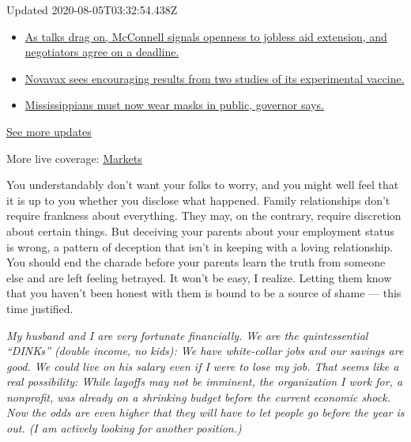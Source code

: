 Updated 2020-08-05T03:32:54.438Z

\begin{itemize}
\tightlist
\item
  \href{https://www.nytimes.com/2020/08/04/world/coronavirus-cases.html?action=click\&pgtype=Article\&state=default\&region=MAIN_CONTENT_1\&context=storylines_live_updates\#link-762df92}{As
  talks drag on, McConnell signals openness to jobless aid extension,
  and negotiators agree on a deadline.}
\item
  \href{https://www.nytimes.com/2020/08/04/world/coronavirus-cases.html?action=click\&pgtype=Article\&state=default\&region=MAIN_CONTENT_1\&context=storylines_live_updates\#link-1228a480}{Novavax
  sees encouraging results from two studies of its experimental
  vaccine.}
\item
  \href{https://www.nytimes.com/2020/08/04/world/coronavirus-cases.html?action=click\&pgtype=Article\&state=default\&region=MAIN_CONTENT_1\&context=storylines_live_updates\#link-794484ed}{Mississippians
  must now wear masks in public, governor says.}
\end{itemize}

\href{https://www.nytimes.com/2020/08/04/world/coronavirus-cases.html?action=click\&pgtype=Article\&state=default\&region=MAIN_CONTENT_1\&context=storylines_live_updates}{See
more updates}

More live coverage:
\href{https://www.nytimes.com/live/2020/08/04/business/stock-market-today-coronavirus?action=click\&pgtype=Article\&state=default\&region=MAIN_CONTENT_1\&context=storylines_live_updates}{Markets}

You understandably don't want your folks to worry, and you might well
feel that it is up to you whether you disclose what happened. Family
relationships don't require frankness about everything. They may, on the
contrary, require discretion about certain things. But deceiving your
parents about your employment status is wrong, a pattern of deception
that isn't in keeping with a loving relationship. You should end the
charade before your parents learn the truth from someone else and are
left feeling betrayed. It won't be easy, I realize. Letting them know
that you haven't been honest with them is bound to be a source of shame
--- this time justified.

\emph{My husband and I are very fortunate financially. We are the
quintessential ``DINKs'' (double income, no kids): We have white-collar
jobs and our savings are good. We could live on his salary even if I
were to lose my job. That seems like a real possibility: While layoffs
may not be imminent, the organization I work for, a nonprofit, was
already on a shrinking budget before the current economic shock. Now the
odds are even higher that they will have to let people go before the
year is out. (I am actively looking for another position.)}

